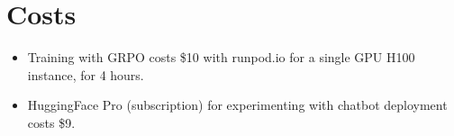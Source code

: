 \section{Costs} \label{app:cost}

\begin{itemize}
  \item Training with GRPO costs \$10 with runpod.io for a single GPU H100 instance, for 4 hours.
  \item HuggingFace Pro (subscription) for experimenting with chatbot deployment costs \$9.
\end{itemize}
